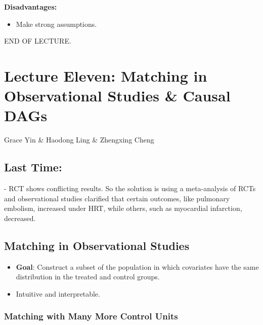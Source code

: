\textbf{Disadvantages:}
\begin{itemize}
    \item Make strong assumptions.
\end{itemize}

END OF LECTURE.



\section{Lecture Eleven: Matching in Observational Studies \& Causal DAGs}{Grace Yin \& Haodong Ling \& Zhengxing Cheng}

\subsection{Last Time:}
- RCT shows conflicting results. So the solution is using a meta-analysis of RCTs and observational studies clarified that certain outcomes, like pulmonary embolism, increased under HRT, while others, such as myocardial infarction, decreased.


\subsection{Matching in Observational Studies}
\begin{itemize}
    \item \textbf{Goal}: Construct a subset of the population in which covariates have the same distribution in the treated and control groups.
    \item Intuitive and interpretable.
\end{itemize}

\subsubsection{Matching with Many More Control Units}

